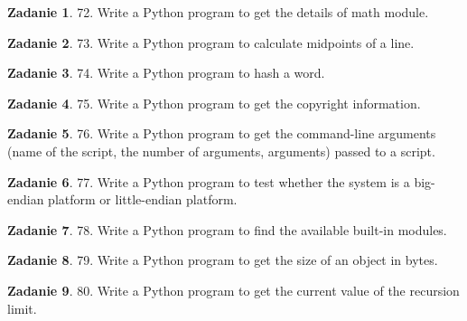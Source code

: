 \documentclass[11pt]{article}
\theoremstyle{definition}
\newtheorem{zadanie}{Zadanie}
\begin{document}
\begin{zadanie}


72. Write a Python program to get the details of math module. 

\end{zadanie}

\begin{zadanie}


73. Write a Python program to calculate midpoints of a line. 

\end{zadanie}

\begin{zadanie}


74. Write a Python program to hash a word. 

\end{zadanie}

\begin{zadanie}


75. Write a Python program to get the copyright information. 

\end{zadanie}

\begin{zadanie}


76. Write a Python program to get the command-line arguments (name of the script, the number of arguments, arguments) passed to a script. 

\end{zadanie}

\begin{zadanie}


77. Write a Python program to test whether the system is a big-endian platform or little-endian platform. 

\end{zadanie}

\begin{zadanie}


78. Write a Python program to find the available built-in modules. 

\end{zadanie}

\begin{zadanie}


79. Write a Python program to get the size of an object in bytes. 

\end{zadanie}

\begin{zadanie}


80. Write a Python program to get the current value of the recursion limit. 

\end{zadanie}
\end{document}
